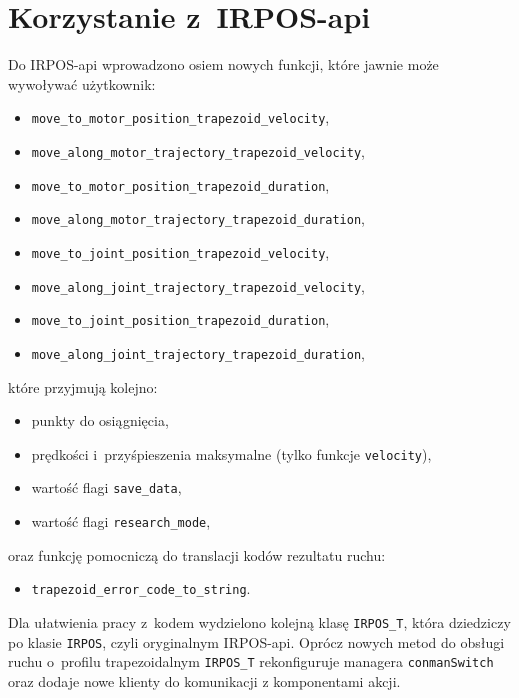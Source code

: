 \documentclass[a4paper, 12pt]{article}
\begin{document}
	\section{Korzystanie z~IRPOS-api}
	\label{sec:api}
	Do IRPOS-api wprowadzono osiem nowych funkcji, które jawnie może wywoływać użytkownik:
	\begin{itemize}
	\item \texttt{move\_to\_motor\_position\_trapezoid\_velocity},
	\item \texttt{move\_along\_motor\_trajectory\_trapezoid\_velocity},
	\item \texttt{move\_to\_motor\_position\_trapezoid\_duration},
	\item \texttt{move\_along\_motor\_trajectory\_trapezoid\_duration},
	\item \texttt{move\_to\_joint\_position\_trapezoid\_velocity},
	\item \texttt{move\_along\_joint\_trajectory\_trapezoid\_velocity},
	\item \texttt{move\_to\_joint\_position\_trapezoid\_duration},
	\item \texttt{move\_along\_joint\_trajectory\_trapezoid\_duration},
	\end{itemize}
	które przyjmują kolejno:
	\begin{itemize}
	\item punkty do osiągnięcia,
	\item prędkości i~przyśpieszenia maksymalne (tylko funkcje \texttt{velocity}),
	\item wartość flagi \texttt{save\_data},
	\item wartość flagi \texttt{research\_mode},
	\end{itemize}
	oraz funkcję pomocniczą do translacji kodów rezultatu ruchu:
	\begin{itemize}
	\item \texttt{trapezoid\_error\_code\_to\_string}.
	\end{itemize}
	
	Dla ułatwienia pracy z~kodem wydzielono kolejną klasę \texttt{IRPOS\_T}, która dziedziczy po klasie \texttt{IRPOS}, czyli oryginalnym IRPOS-api. Oprócz nowych metod do obsługi ruchu o~profilu trapezoidalnym \texttt{IRPOS\_T} rekonfiguruje managera \texttt{conmanSwitch} oraz dodaje nowe klienty do komunikacji z komponentami akcji.
	
\end{document}
